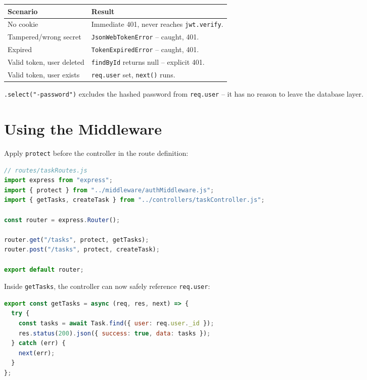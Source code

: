 \begin{center}
\begin{tabularx}{\textwidth}{lX}
\toprule
\textbf{Scenario} & \textbf{Result} \\
\midrule
No cookie & Immediate 401, never reaches \texttt{jwt.verify}. \\
Tampered/wrong secret & \texttt{JsonWebTokenError} -- caught, 401. \\
Expired & \texttt{TokenExpiredError} -- caught, 401. \\
Valid token, user deleted & \texttt{findById} returns null -- explicit 401. \\
Valid token, user exists & \texttt{req.user} set, \texttt{next()} runs. \\
\bottomrule
\end{tabularx}
\end{center}

\begin{notebox}[NOTE]
\texttt{.select("-password")} excludes the hashed password from \texttt{req.user} -- it has no reason to leave the database layer.
\end{notebox}

\section{Using the Middleware}

Apply \texttt{protect} before the controller in the route definition:

\begin{lstlisting}[language=JavaScript]
// routes/taskRoutes.js
import express from "express";
import { protect } from "../middleware/authMiddleware.js";
import { getTasks, createTask } from "../controllers/taskController.js";

const router = express.Router();

router.get("/tasks", protect, getTasks);
router.post("/tasks", protect, createTask);

export default router;
\end{lstlisting}

Inside \texttt{getTasks}, the controller can now safely reference \texttt{req.user}:

\begin{lstlisting}[language=JavaScript]
export const getTasks = async (req, res, next) => {
  try {
    const tasks = await Task.find({ user: req.user._id });
    res.status(200).json({ success: true, data: tasks });
  } catch (err) {
    next(err);
  }
};
\end{lstlisting}

